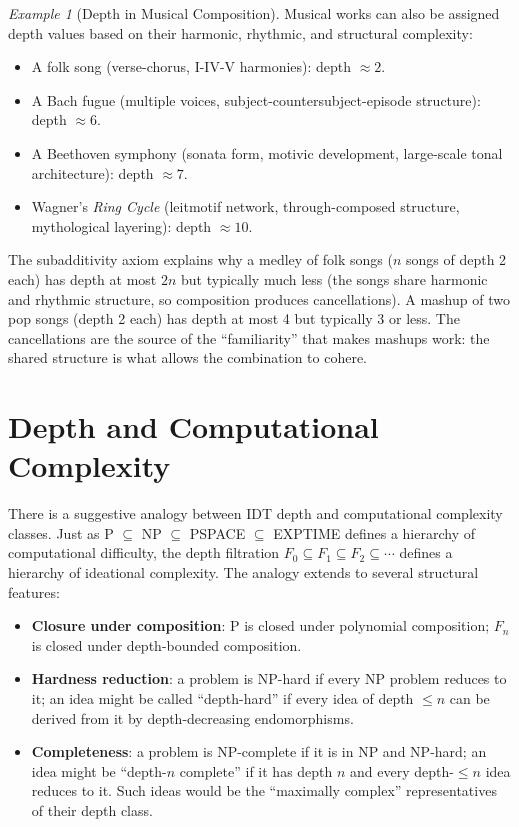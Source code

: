 \documentclass[11pt,openany]{book}
\theoremstyle{definition}
\theoremstyle{plain}
\theoremstyle{remark}
\newtheorem{example}[axiom]{Example}
\begin{document}
\begin{example}[Depth in Musical Composition]
Musical works can also be assigned depth values based on their harmonic, rhythmic, and structural complexity:
\begin{itemize}
\item A folk song (verse-chorus, I-IV-V harmonies): depth $\approx 2$.
\item A Bach fugue (multiple voices, subject-countersubject-episode structure): depth $\approx 6$.
\item A Beethoven symphony (sonata form, motivic development, large-scale tonal architecture): depth $\approx 7$.
\item Wagner's \emph{Ring Cycle} (leitmotif network, through-composed structure, mythological layering): depth $\approx 10$.
\end{itemize}

The subadditivity axiom explains why a medley of folk songs ($n$ songs of depth 2 each) has depth at most $2n$ but typically much less (the songs share harmonic and rhythmic structure, so composition produces cancellations). A mashup of two pop songs (depth 2 each) has depth at most 4 but typically 3 or less. The cancellations are the source of the ``familiarity'' that makes mashups work: the shared structure is what allows the combination to cohere.
\end{example}

\section{Depth and Computational Complexity}

There is a suggestive analogy between IDT depth and computational complexity classes. Just as P $\subseteq$ NP $\subseteq$ PSPACE $\subseteq$ EXPTIME defines a hierarchy of computational difficulty, the depth filtration $F_0 \subseteq F_1 \subseteq F_2 \subseteq \cdots$ defines a hierarchy of ideational complexity. The analogy extends to several structural features:

\begin{itemize}
\item \textbf{Closure under composition}: P is closed under polynomial composition; $F_n$ is closed under depth-bounded composition.
\item \textbf{Hardness reduction}: a problem is NP-hard if every NP problem reduces to it; an idea might be called ``depth-hard'' if every idea of depth $\leq n$ can be derived from it by depth-decreasing endomorphisms.
\item \textbf{Completeness}: a problem is NP-complete if it is in NP and NP-hard; an idea might be ``depth-$n$ complete'' if it has depth $n$ and every depth-$\leq n$ idea reduces to it. Such ideas would be the ``maximally complex'' representatives of their depth class.
\end{itemize}
\end{document}
